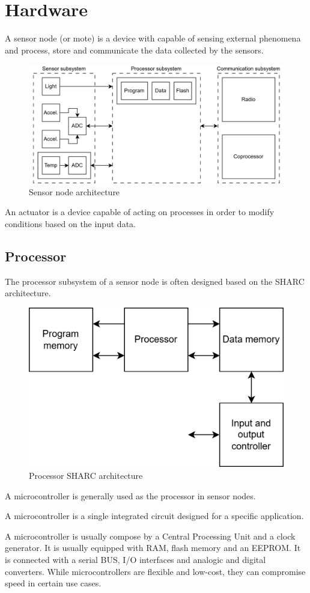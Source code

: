 \section{Hardware}

\begin{definition}
    A sensor node (or mote) is a device with capable of sensing external phenomena and process, store and communicate the data collected by the sensors.
\end{definition}

\begin{figure}[H]
    \centering
    \includegraphics[width=0.75\linewidth]{images/sn.png}
    \caption{Sensor node architecture}
\end{figure}

\begin{definition}
    An actuator is a device capable of acting on processes in order to modify conditions based on the input data.
\end{definition}

\subsection{Processor}
The processor subsystem of a sensor node is often designed based on the SHARC architecture. 
\begin{figure}[H]
    \centering
    \includegraphics[width=0.5\linewidth]{images/pss.png}
    \caption{Processor SHARC architecture}
\end{figure}

A microcontroller is generally used as the processor in sensor nodes.
\begin{definition}
    A microcontroller is a single integrated circuit designed for a specific application.
\end{definition}
\noindent A microcontroller is usually compose by a Central Processing Unit and a clock generator. 
It is usually equipped with RAM, flash memory and an EEPROM. 
It is connected with a serial BUS, I/O interfaces and analogic and digital converters. 
While microcontrollers are flexible and low-cost, they can compromise speed in certain use cases.

